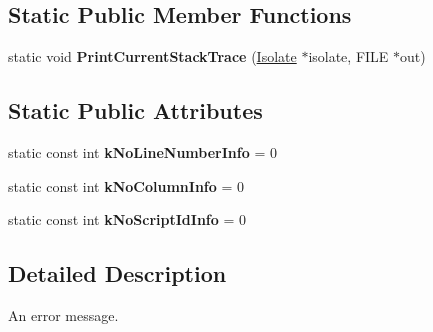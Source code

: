\subsection*{Static Public Member Functions}
\begin{DoxyCompactItemize}
\item 
\hypertarget{classv8_1_1Message_ae5d67d123c5611e6bc36824c938cbfa5}{static void {\bfseries Print\-Current\-Stack\-Trace} (\hyperlink{classv8_1_1Isolate}{Isolate} $\ast$isolate, F\-I\-L\-E $\ast$out)}\label{classv8_1_1Message_ae5d67d123c5611e6bc36824c938cbfa5}

\end{DoxyCompactItemize}
\subsection*{Static Public Attributes}
\begin{DoxyCompactItemize}
\item 
\hypertarget{classv8_1_1Message_a35649a6c0c813ba82c9886a2b17da124}{static const int {\bfseries k\-No\-Line\-Number\-Info} = 0}\label{classv8_1_1Message_a35649a6c0c813ba82c9886a2b17da124}

\item 
\hypertarget{classv8_1_1Message_a8cb643dbf408b0fd2526b23a8202c4a6}{static const int {\bfseries k\-No\-Column\-Info} = 0}\label{classv8_1_1Message_a8cb643dbf408b0fd2526b23a8202c4a6}

\item 
\hypertarget{classv8_1_1Message_a5aac643173466e88544cb1daa74553d6}{static const int {\bfseries k\-No\-Script\-Id\-Info} = 0}\label{classv8_1_1Message_a5aac643173466e88544cb1daa74553d6}

\end{DoxyCompactItemize}


\subsection{Detailed Description}
An error message. 

